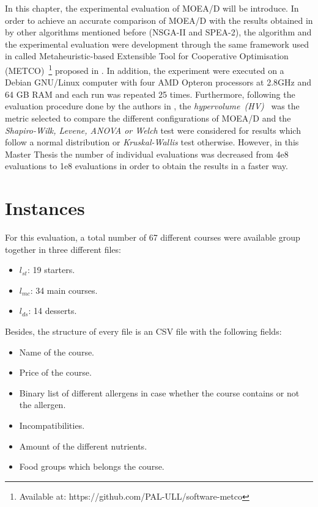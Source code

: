 
In this chapter, the experimental evaluation of MOEA/D will be introduce. In order to achieve an accurate comparison of MOEA/D with the results obtained in \cite{Miranda2018} by other algorithms mentioned before (NSGA-II and SPEA-2), the algorithm and the experimental evaluation were development through the same framework used in \cite{Miranda2018} called Metaheuristic-based Extensible Tool for Cooperative Optimisation (METCO)~\footnote{Available at: https://github.com/PAL-ULL/software-metco} proposed in \cite{METCO}.
In addition, the experiment were executed on a Debian GNU/Linux computer with four AMD Opteron processors at 2.8GHz and 64 GB RAM and each run was repeated 25 times.
Furthermore, following the evaluation procedure done by the authors in \cite{Miranda2018}, the \textit{hypervolume~(HV)}~\cite{HYPER} was the metric selected to compare the different configurations of MOEA/D and the \textit{Shapiro-Wilk, Levene, ANOVA or Welch} test were considered for results which follow a normal distribution or \textit{Kruskal-Wallis} test otherwise. However, in this Master Thesis the number of individual evaluations was decreased from 4e8 evaluations to 1e8 evaluations in order to obtain the results in a faster way.
\section{Instances}
For this evaluation, a total number of 67 different courses were available group together in three different files:
\begin{itemize}
    \item $l_{st}$: 19 starters.
    \item $l_{mc}$: 34 main courses.
    \item $l_{ds}$: 14 desserts.
\end{itemize}
Besides, the structure of every file is an CSV file with the following fields:
\begin{itemize}
    \item Name of the course.
    \item Price of the course.
    \item Binary list of different allergens in case whether the course contains or not the allergen.
    \item Incompatibilities.
    \item Amount of the different nutrients.
    \item Food groups which belongs the course.
\end{itemize}
